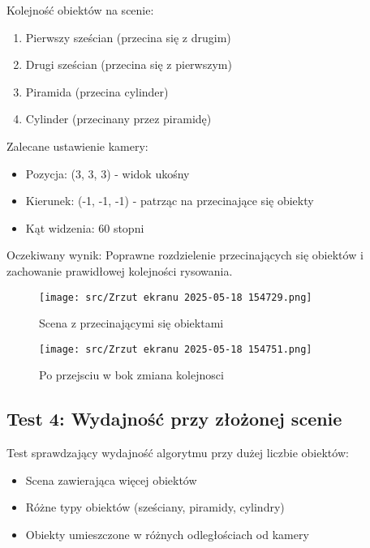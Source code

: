 \documentclass[a4paper,12pt]{article}
\begin{document}
Kolejność obiektów na scenie:
\begin{enumerate}
    \item Pierwszy sześcian (przecina się z drugim)
    \item Drugi sześcian (przecina się z pierwszym)
    \item Piramida (przecina cylinder)
    \item Cylinder (przecinany przez piramidę)
\end{enumerate}

Zalecane ustawienie kamery:
\begin{itemize}
    \item Pozycja: (3, 3, 3) - widok ukośny
    \item Kierunek: (-1, -1, -1) - patrząc na przecinające się obiekty
    \item Kąt widzenia: 60 stopni
\end{itemize}

Oczekiwany wynik: Poprawne rozdzielenie przecinających się obiektów i zachowanie prawidłowej kolejności rysowania.

\begin{figure}[h]
    \centering
    \begin{minipage}{0.48\textwidth}
        \centering
        \texttt{[image: src/Zrzut ekranu 2025-05-18 154729.png]}
        \caption{Scena z przecinającymi się obiektami}
    \end{minipage}
    \hfill
    \begin{minipage}{0.48\textwidth}
        \centering
        \texttt{[image: src/Zrzut ekranu 2025-05-18 154751.png]}
        \caption{Po przejsciu w bok zmiana kolejnosci}
    \end{minipage}
\end{figure}

\subsection{Test 4: Wydajność przy złożonej scenie}
Test sprawdzający wydajność algorytmu przy dużej liczbie obiektów:
\begin{itemize}
    \item Scena zawierająca więcej obiektów
    \item Różne typy obiektów (sześciany, piramidy, cylindry)
    \item Obiekty umieszczone w różnych odległościach od kamery
\end{itemize}
\end{document}

